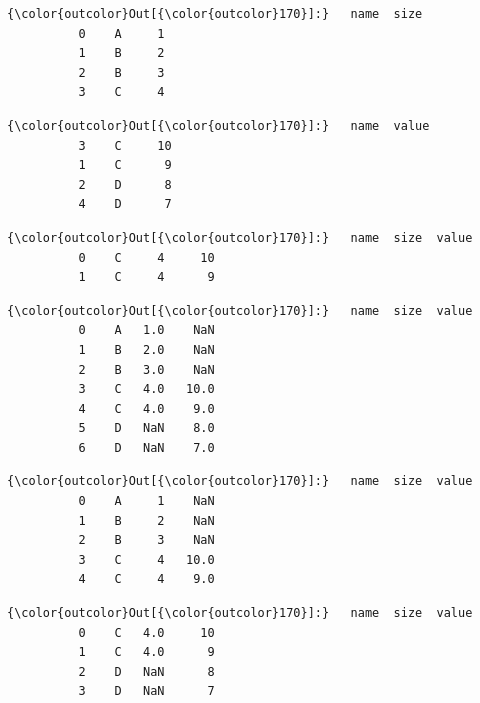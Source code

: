\documentclass[11pt]{article}
\begin{document}
\begin{Verbatim}[commandchars=\\\{\}]
{\color{outcolor}Out[{\color{outcolor}170}]:}   name  size
          0    A     1
          1    B     2
          2    B     3
          3    C     4
\end{Verbatim}
            
\begin{Verbatim}[commandchars=\\\{\}]
{\color{outcolor}Out[{\color{outcolor}170}]:}   name  value
          3    C     10
          1    C      9
          2    D      8
          4    D      7
\end{Verbatim}
            
\begin{Verbatim}[commandchars=\\\{\}]
{\color{outcolor}Out[{\color{outcolor}170}]:}   name  size  value
          0    C     4     10
          1    C     4      9
\end{Verbatim}
            
\begin{Verbatim}[commandchars=\\\{\}]
{\color{outcolor}Out[{\color{outcolor}170}]:}   name  size  value
          0    A   1.0    NaN
          1    B   2.0    NaN
          2    B   3.0    NaN
          3    C   4.0   10.0
          4    C   4.0    9.0
          5    D   NaN    8.0
          6    D   NaN    7.0
\end{Verbatim}
            
\begin{Verbatim}[commandchars=\\\{\}]
{\color{outcolor}Out[{\color{outcolor}170}]:}   name  size  value
          0    A     1    NaN
          1    B     2    NaN
          2    B     3    NaN
          3    C     4   10.0
          4    C     4    9.0
\end{Verbatim}
            
\begin{Verbatim}[commandchars=\\\{\}]
{\color{outcolor}Out[{\color{outcolor}170}]:}   name  size  value
          0    C   4.0     10
          1    C   4.0      9
          2    D   NaN      8
          3    D   NaN      7
\end{Verbatim}
            
\end{document}
